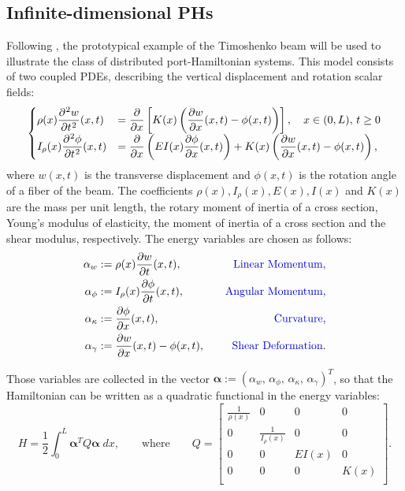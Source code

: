 \documentclass[preprint,12pt]{elsarticle}
\newcommand{\secondReviewer}[1]{\textcolor{blue!80!black}{#1}}
\begin{document}
\subsection{Infinite-dimensional PHs}
Following \cite[Chapter~3]{BookZwart}, the prototypical example of the Timoshenko beam will be used to illustrate the class of distributed port-Hamiltonian systems. This model consists of two coupled PDEs, describing the vertical displacement and rotation scalar fields:
\begin{equation}
\label{eq:TimoModel}
\begin{cases}
\displaystyle \rho(x) \diffp[2]{w}{t}(x,t) &= \displaystyle \diffp{}{x} \left[K(x) \left(\diffp{w}{x}(x,t) - \phi(x,t)\right)\right], \quad x \in (0,L),\, t \ge 0 \\
\displaystyle I_{\rho}(x) \diffp[2]{\phi}{t}(x,t) &= \displaystyle \diffp{}{x} \left(EI(x) \diffp{ \phi}{x}(x,t)\right) + K(x) \left(\diffp{w}{x}(x,t) - \phi(x,t) \right),
\end{cases}
\end{equation}
where ${w}(x,t)$ is the transverse displacement and $\phi(x,t)$ is the rotation angle of a fiber of the beam. The coefficients $\rho(x), I_{\rho}(x), E(x), I(x)$ and $K(x)$ are the mass per unit length, the rotary moment of inertia of a cross section, Young's modulus of elasticity, the moment of inertia of a cross section and the shear modulus, respectively. The energy variables are chosen as follows:
\begin{equation}
\begin{aligned}
\alpha_{w} &:= \rho(x) \diffp{w}{t}(x,t), \quad &\text{\secondReviewer{Linear Momentum,}} \\
\alpha_{\phi} &:= I_{\rho}(x) \diffp{\phi}{t}(x,t), \quad &\text{\secondReviewer{Angular Momentum,}} \\
\alpha_{\kappa} &:= \diffp{\phi}{x}(x,t), \quad &\text{\secondReviewer{Curvature,}} \\
\alpha_{\gamma} &:= \diffp{w}{x}(x,t) - \phi(x,t), \quad &\text{\secondReviewer{Shear Deformation}}. \\
\end{aligned}
\end{equation}

Those variables are collected in the vector $\bm{\alpha} := (\alpha_{w}, \, \alpha_{\phi}, \, \alpha_{\kappa}, \, \alpha_{\gamma} )^T $, so that the Hamiltonian can be written as a quadratic functional in the energy variables: 
\begin{equation}
H = \frac{1}{2} \int_{0}^{L} \bm{\alpha}^T Q \bm{\alpha} \; dx,
\qquad \text{where} \qquad
Q = 
\begin{bmatrix}
\frac{1}{\rho(x)} & 0 & 0 & 0 \\
0 & \frac{1}{I_{\rho}(x)} & 0 & 0 \\
0 & 0 & EI(x) & 0 \\
0 & 0 & 0 & K(x) \\
\end{bmatrix}.
\end{equation}
\end{document}
